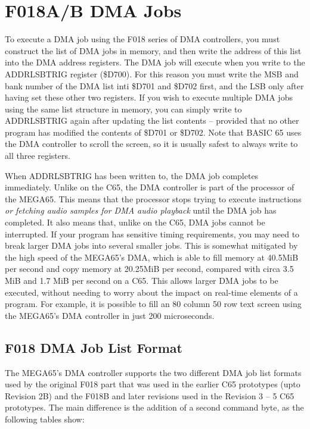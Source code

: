 \section{F018A/B DMA Jobs}

To execute a DMA job using the F018 series of DMA controllers, you must construct the list of DMA jobs in memory,
and then write the address of this list into the DMA address registers.  The DMA job will execute when you write to
the ADDRLSBTRIG register (\$D700).  For this reason you must write the MSB and bank number of the DMA list inti \$D701 and \$D702 first,
and the LSB only after having set these other two registers.  If you wish to execute multiple DMA jobs using the same
list structure in memory, you can simply write to ADDRLSBTRIG again after updating the list contents -- provided that
no other program has modified the contents of \$D701 or \$D702.  Note that BASIC 65 uses the DMA controller to
scroll the screen, so it is usually safest to always write to all three registers.

When ADDRLSBTRIG has been written to, the DMA job completes immediately.  Unlike on the C65, the DMA controller is part
of the processor of the MEGA65. This means that the processor stops trying to execute instructions {\em or fetching audio samples for DMA audio playback} until the DMA job
has completed.  It also means that, unlike on the C65, DMA jobs cannot be interrupted. If your program has sensitive timing
requirements, you may need to break larger DMA jobs into several smaller jobs.  This is somewhat mitigated by the high
speed of the MEGA65's DMA, which is able to fill memory at 40.5MiB per second and copy memory at 20.25MiB per second, compared
with circa 3.5 MiB and 1.7 MiB per second on a C65. This allows larger DMA jobs to be executed, without needing to worry about
the impact on real-time elements of a program. For example, it is possible to fill an 80 column 50 row text screen using the
MEGA65's DMA controller in just 200 microseconds.

\subsection{F018 DMA Job List Format}

The MEGA65's DMA controller supports the two different DMA job list formats used by the original F018 part that
was used in the earlier C65 prototypes (upto Revision 2B) and the F018B and later revisions used in the Revision 3 -- 5
C65 prototypes.  The main difference is the addition of a second command byte, as the following tables show:

